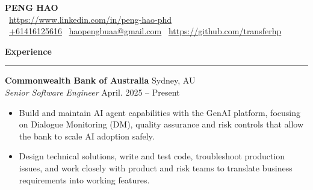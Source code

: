 \documentclass[a4paper,10pt]{article}
\begin{document}
\begin{center}
    {\LARGE \textbf{PENG HAO}} \\

    \faHome\ \href{https://www.linkedin.com/in/peng-hao-phd}{https://www.linkedin.com/in/peng-hao-phd} \\[1em]

    \faPhone\ \href{tel:+61416125616}{+61416125616} 
    \quad  %
    \faEnvelope\ \href{mailto:haopengbuaa@gmail.com}{haopengbuaa@gmail.com}
    \quad %
    \faGithub\ \href{https://github.com/transferhp}{https://github.com/transferhp}
\end{center}

\vspace{0.1em}

\begin{center}
    \textbf{\large Experience} \\
    \rule{\textwidth}{0.1pt}
\end{center}

\noindent
\textbf{Commonwealth Bank of Australia} \hfill Sydney, AU \\
\textit{Senior Software Engineer} \hfill April. 2025 – Present \\
\begin{itemize}[leftmargin=0.15in, itemsep=1pt]
    \item Build and maintain AI agent capabilities with the GenAI platform, focusing on Dialogue Monitoring (DM), quality assurance and risk controls that allow the bank to scale AI adoption safely.
    \item Design technical solutions, write and test code, troubleshoot production issues, and work closely with product and risk teams to translate business requirements into working features.
\end{itemize}

\vspace{0.1em}
\end{document}
